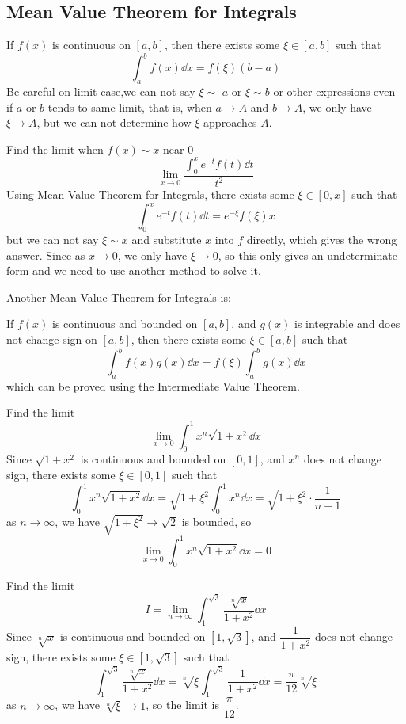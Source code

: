 \documentclass{overview}
\begin{document}
\subsection{Mean Value Theorem for Integrals}
If $f(x)$ is continuous on $[a, b]$, then there exists some $\xi \in [a, b]$ such that
\[
	\int_a^b f(x) \dd x = f(\xi)(b-a)
\]
Be careful on limit case,we can not say $\xi\sim$ $a$ or $\xi\sim b$ or other expressions
even if $a$ or $b$ tends to same limit, that is, when $a \to A$ and $b \to A$, 
we only have $\xi \to A$, but we can not determine how $\xi$ approaches $A$.
\begin{example}
	Find the limit when $f (x)\sim x$ near $0$
	\[
		\lim_{x \to 0} \frac{\int_0^x e^{-t} f(t) \dd t}{t^2}
	\]
	Using Mean Value Theorem for Integrals, there exists some $\xi \in [0, x]$ such that
	\[
		\int_0^x e^{-t} f(t) \dd t = e^{-\xi} f(\xi) x
	\]
	but we can not say $\xi \sim x$ and substitute $x$ into $f$ directly, which gives
	the wrong answer. Since as $x \to 0$, we only have $\xi \to 0$, so this
	only gives an undeterminate form and we need to use another method to solve it.
\end{example}

Another Mean Value Theorem for Integrals is:
\begin{theorem}
	If $f(x)$ is continuous and bounded on $[a, b]$, and $g(x)$ is integrable
	and does not change sign on $[a, b]$, then there exists some $\xi \in [a, b]$
	such that
	\[
		\int_a^b f(x) g(x) \dd x = f(\xi) \int_a^b g(x) \dd x
	\]
	which can be proved using the Intermediate Value Theorem.
\end{theorem}
\begin{example}
	Find the limit
	\[
		\lim_{x \to 0} \int_0^1 x^{n} \sqrt{1+x^2} \dd x
	\]
	Since $\sqrt{1+x^2}$ is continuous and bounded on $[0, 1]$, and
	$x^{n}$ does not change sign, there exists some $\xi \in [0, 1]$ such that
	\[
		\int_0^1 x^{n} \sqrt{1+x^2} \dd x = \sqrt{1+\xi^2} \int_0^1 x^{n} \dd x
		= \sqrt{1+\xi^2} \cdot \frac{1}{n+1}
	\]
	as $n \to \infty$, we have $\sqrt{1+\xi^2} \to \sqrt{2}$ is bounded, so
	\[
		\lim_{x \to 0} \int_0^1 x^{n} \sqrt{1+x^2} \dd x = 0
	\]
\end{example}

\begin{example}
	Find the limit
	\[
		I=\lim_{n \to \infty} \int_1^{\sqrt3} \dfrac{\sqrt[n]{x}}{1+x^2} \dd x
	\]
	Since $\sqrt[n]{x}$ is continuous and bounded on $[1, \sqrt3]$, and
	$\dfrac{1}{1+x^2}$ does not
	change sign, there exists some $\xi \in [1, \sqrt3]$ such that
	\[
		\int_1^{\sqrt3} \dfrac{\sqrt[n]{x}}{1+x^2} \dd x
		= \sqrt[n]{\xi} \int_1^{\sqrt3} \dfrac{1}{1+x^2} \dd x
		= \frac{\pi}{12}\sqrt[n]{\xi}
	\]
	as $n \to \infty$, we have $\sqrt[n]{\xi} \to 1$, so the limit is $\dfrac{\pi}{12}$.
\end{example}
	
\end{document}
